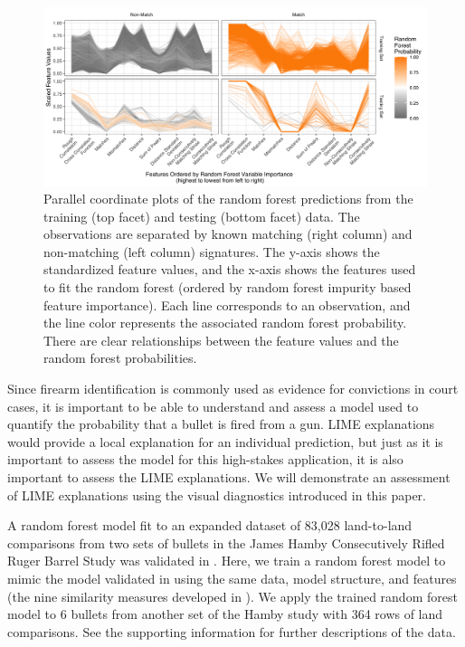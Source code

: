 \documentclass[AMS,STIX2COL]{WileyNJD-v2}\usepackage[]{graphicx}\usepackage[]{color}
\newenvironment{knitrout}{}{} %
\begin{document}
\begin{figure}[!thp]
\begin{knitrout}
\color{fgcolor}

{\centering \includegraphics[width=6.5in]{figure-static/figure-09-1} 

}



\end{knitrout}
\caption{Parallel coordinate plots of the \citet{hare:2017} random forest predictions from the training (top facet) and testing (bottom facet) data. The observations are separated by known matching (right column) and non-matching (left column) signatures. The y-axis shows the standardized feature values, and the x-axis shows the features used to fit the random forest (ordered by random forest impurity based feature importance). Each line corresponds to an observation, and the line color represents the associated random forest probability. There are clear relationships between the feature values and the random forest probabilities.}
\label{fig:figure-09}
\end{figure}

Since firearm identification is commonly used as evidence for convictions in court cases, it is important to be able to understand and assess a model used to quantify the probability that a bullet is fired from a gun. LIME explanations would provide a local explanation for an individual prediction, but just as it is important to assess the model for this high-stakes application, it is also important to assess the LIME explanations. We will demonstrate an assessment of LIME explanations using the visual diagnostics introduced in this paper.

A random forest model fit to an expanded dataset of 83,028 land-to-land comparisons from two sets of bullets in the James Hamby Consecutively Rifled Ruger Barrel Study \citep{hamby:2009} was validated in \citet{vanderplas:2020}. Here, we train a random forest model to mimic the model validated in \citet{vanderplas:2020} using the same data, model structure, and features (the nine similarity measures developed in \citet{hare:2017}). We apply the trained random forest model to 6 bullets from another set of the Hamby study with 364 rows of land comparisons. See the supporting information for further descriptions of the data. 
\end{document}
